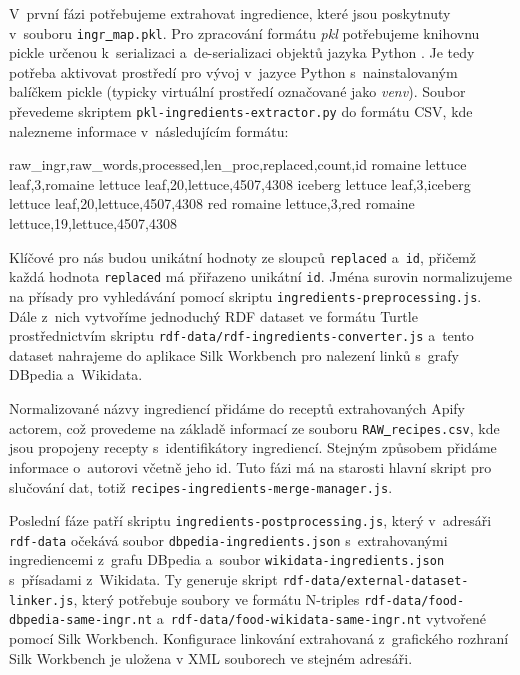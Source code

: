 V~první fázi potřebujeme extrahovat ingredience, které jsou poskytnuty v~souboru \texttt{ingr\underline{{ }}map.pkl}. Pro zpracování formátu \emph{pkl} potřebujeme knihovnu pickle určenou k~serializaci a~de-serializaci objektů jazyka Python \citep{pickle}. Je tedy potřeba aktivovat prostředí pro vývoj v~jazyce Python s~nainstalovaným balíčkem pickle (typicky virtuální prostředí označované jako \emph{venv}). Soubor převedeme skriptem \texttt{pkl-ingredients-extractor.py} do formátu CSV, kde nalezneme informace v~následujícím formátu:

\begin{code}
raw_ingr,raw_words,processed,len_proc,replaced,count,id
romaine lettuce leaf,3,romaine lettuce leaf,20,lettuce,4507,4308
iceberg lettuce leaf,3,iceberg lettuce leaf,20,lettuce,4507,4308
red romaine lettuce,3,red romaine lettuce,19,lettuce,4507,4308
\end{code}

Klíčové pro nás budou unikátní hodnoty ze sloupců \texttt{replaced} a~\texttt{id}, přičemž každá hodnota \texttt{replaced} má přiřazeno unikátní \texttt{id}. Jména surovin normalizujeme na přísady pro vyhledávání pomocí skriptu \texttt{ingredients-preprocessing.js}. Dále z~nich vytvoříme jednoduchý RDF dataset ve formátu Turtle prostřednictvím skriptu \texttt{rdf-data/rdf-ingredients-converter.js} a~tento dataset nahrajeme do aplikace Silk Workbench pro nalezení linků s~grafy DBpedia a~Wikidata.

Normalizované názvy ingrediencí přidáme do receptů extrahovaných Apify actorem, což provedeme na základě informací ze souboru \texttt{RAW\underline{{ }}recipes.csv}, kde jsou propojeny recepty s~identifikátory ingrediencí. Stejným způsobem přidáme informace o~autorovi včetně jeho id. Tuto fázi má na starosti hlavní skript pro slučování dat, totiž \texttt{recipes-ingredients-merge-manager.js}.

Poslední fáze patří skriptu \texttt{ingredients-postprocessing.js}, který v~adresáři \texttt{rdf-data} očekává soubor \texttt{dbpedia-ingredients.json} s~extrahovanými ingrediencemi z~grafu DBpedia a~soubor \texttt{wikidata-ingredients.json} s~přísadami z~Wikidata. Ty generuje skript \texttt{rdf-data/external-dataset-linker.js}, který potřebuje soubory ve formátu N-triples \texttt{rdf-data/food-dbpedia-same-ingr.nt} a~\texttt{rdf-data/food-wikidata-same-ingr.nt} vytvořené pomocí Silk Workbench. Konfigurace linkování extrahovaná z~grafického rozhraní Silk Workbench je uložena v XML souborech ve stejném adresáři.

